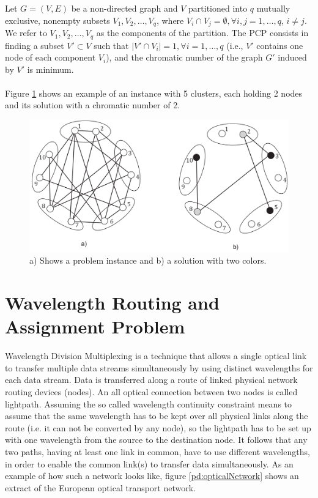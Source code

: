 Let $G = (V, E)$ be a non-directed graph and $V$ partitioned into $q$ mutually exclusive, nonempty subsets $V_1, V_2,\ldots, V_q$, where $V_i \cap V_j = \emptyset, \forall i, j = 1, \ldots , q$, $i \neq j$. We refer to $V_1, V_2, \ldots , V_q$ as the components of the partition. The PCP consists in finding a subset $V' \subset V$ such that $|V' \cap V_i| = 1, \forall i = 1, \ldots , q$ (i.e., $V'$ contains one node of each component $V_i$), and the chromatic number of the graph $G'$ induced by $V'$ is minimum.\\\\
Figure \ref{pd:pcpExample} shows an example of an instance with 5 clusters, each holding 2 nodes and its solution with a chromatic number of 2.

\begin{figure}
\begin{center}
\includegraphics[scale=0.25]{figures/pcp.png}
\caption{a) Shows a problem instance and b) a solution with two colors.}
\label{pd:pcpExample}
\end{center}
\end{figure}


\section{Wavelength Routing and Assignment Problem}
\label{sec:minrwa}

Wavelength Division Multiplexing is a technique that allows a single optical link to transfer multiple data streams simultaneously by using distinct wavelengths for each data stream. Data is transferred along a route of linked physical network routing devices (nodes). An all optical connection between two nodes is called lightpath. Assuming the so called wavelength continuity constraint means to assume that the same wavelength has to be kept over all physical links along the route (i.e. it can not be converted by any node), so the lightpath has to be set up with one wavelength from the source to the destination node. It follows that any two paths, having at least one link in common, have to use different wavelengths, in order to enable the common link(s) to transfer data simultaneously. As an example of how such a network looks like, figure \ref{pd:opticalNetwork} shows an extract of the European optical transport network.\\

